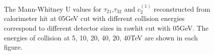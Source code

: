 \begin{figure}
\begin{center}
   \end{center}
\caption{The Mann-Whitney U values for $\tau_{21}$,$\tau_{32}$ and $c_2^{(1)}$ reconstructed from calorimeter hit at 05GeV cut with different collision energies correspond to different detector sizes in rawhit cut with 05GeV. The energies of collision at 5, 10, 20, 40, 20, 40TeV are shown in each figure.}
\label{fig:Rawhit_05GeV_total_Mann}
\end{figure}



